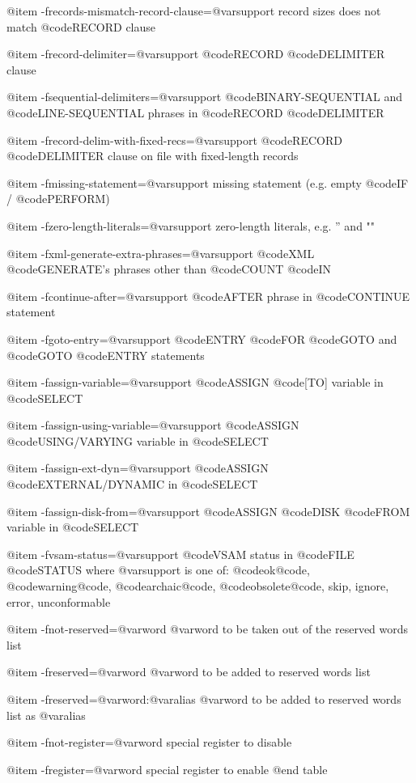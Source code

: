 @item -frecords-mismatch-record-clause=@var{support}
record sizes does not match @code{RECORD} clause

@item -frecord-delimiter=@var{support}
@code{RECORD} @code{DELIMITER} clause

@item -fsequential-delimiters=@var{support}
@code{BINARY-SEQUENTIAL} and @code{LINE-SEQUENTIAL} phrases in @code{RECORD} @code{DELIMITER}

@item -frecord-delim-with-fixed-recs=@var{support}
@code{RECORD} @code{DELIMITER} clause on file with fixed-length records

@item -fmissing-statement=@var{support}
missing statement (e.g. empty @code{IF} / @code{PERFORM})

@item -fzero-length-literals=@var{support}
zero-length literals, e.g. '' and ""

@item -fxml-generate-extra-phrases=@var{support}
@code{XML} @code{GENERATE'}s phrases other than @code{COUNT} @code{IN}

@item -fcontinue-after=@var{support}
@code{AFTER} phrase in @code{CONTINUE} statement

@item -fgoto-entry=@var{support}
@code{ENTRY} @code{FOR} @code{GOTO} and @code{GOTO} @code{ENTRY} statements

@item -fassign-variable=@var{support}
@code{ASSIGN} @code{[TO]} variable in @code{SELECT}

@item -fassign-using-variable=@var{support}
@code{ASSIGN} @code{USING/VARYING} variable in @code{SELECT}

@item -fassign-ext-dyn=@var{support}
@code{ASSIGN} @code{EXTERNAL/DYNAMIC} in @code{SELECT}

@item -fassign-disk-from=@var{support}
@code{ASSIGN} @code{DISK} @code{FROM} variable in @code{SELECT}

@item -fvsam-status=@var{support}
@code{VSAM} status in @code{FILE} @code{STATUS}
	where @var{support} is one of:
	@code{ok@code{, @code{warning@code{, @code{archaic@code{, @code{obsolete@code{, }skip}, }ignore}, }error}, }unconformable}

@item -fnot-reserved=@var{word}
@var{word} to be taken out of the reserved words list

@item -freserved=@var{word}
@var{word} to be added to reserved words list

@item -freserved=@var{word}:@var{alias}
@var{word} to be added to reserved words list as @var{alias}

@item -fnot-register=@var{word}
special register to disable

@item -fregister=@var{word}
special register to enable
@end table
